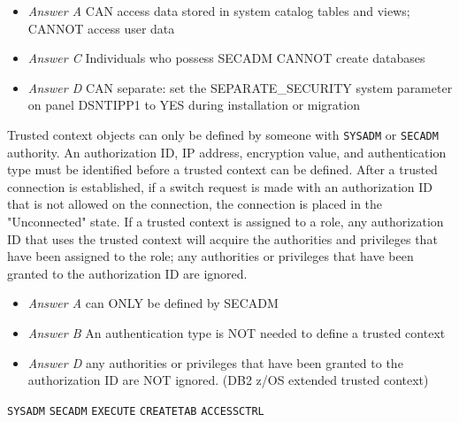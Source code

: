 \documentclass[answers, 11pt]{exam}
\begin{document}
\begin{questions}
\begin{solution}
\begin{itemize}
\item \textit{Answer A} CAN access data stored in system catalog tables and views; CANNOT access user data
\item \textit{Answer C} Individuals who possess SECADM CANNOT create databases
\item \textit{Answer D} CAN separate: set the SEPARATE\_SECURITY system parameter on panel DSNTIPP1 to YES
during installation or migration
\end{itemize}
\end{solution}

\begin{choices}
\choice Trusted context objects can only be defined by someone with \texttt{SYSADM} or \texttt{SECADM}
authority.
\choice An authorization ID, IP address, encryption value, and authentication type must be identified
before a trusted context can be defined.
\CorrectChoice After a trusted connection is established, if a switch request is made with an authorization ID
that is not allowed on the connection, the connection is placed in the "Unconnected" state.
\choice If a trusted context is assigned to a role, any authorization ID that uses the trusted context
will acquire the authorities and privileges that have been assigned to the role; any authorities or
privileges that have been granted to the authorization ID are ignored.
\end{choices}

\begin{solution}
\begin{itemize}
\item \textit{Answer A} can ONLY be defined by SECADM
\item \textit{Answer B} An authentication type is NOT needed to define a trusted context
\item \textit{Answer D} any authorities or privileges that have been granted to the authorization ID are 
NOT ignored. (DB2 z/OS extended trusted context)
\end{itemize}
\end{solution}

\newpage
{}
\begin{choices}
\choice \texttt{SYSADM}
\choice \texttt{SECADM}
\CorrectChoice \texttt{EXECUTE}
\CorrectChoice \texttt{CREATETAB}
\choice \texttt{ACCESSCTRL}
\end{choices}


\end{questions}
\end{document}
